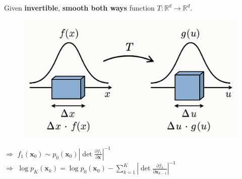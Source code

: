 \documentclass{beamer}
\begin{document}
\begin{frame}
    Given \textbf{invertible}, \textbf{smooth both ways} function \( T : \mathbb{R}^d \to \mathbb{R}^d \).
    \begin{figure}
        \includegraphics[width=0.5\linewidth]{figures/COVT.png}
    \end{figure}
    \( \Rightarrow \) \( f_{1}(\mathbf{x}_0) \sim p_{0}(\mathbf{x}_0) \left| \det \frac{\partial f_{1}}{\partial \mathbf{x}} \right|^{-1}  \) \\
    \( \Rightarrow \) \( \log p_K(\mathbf{x}_k) = \log p_{0}(\mathbf{x}_0) - \sum_{k = 1}^{K} \left| \det \frac{\partial f_{k}}{\partial \mathbf{x}_{k - 1}} \right|^{-1}  \)
\end{frame}
\end{document}
